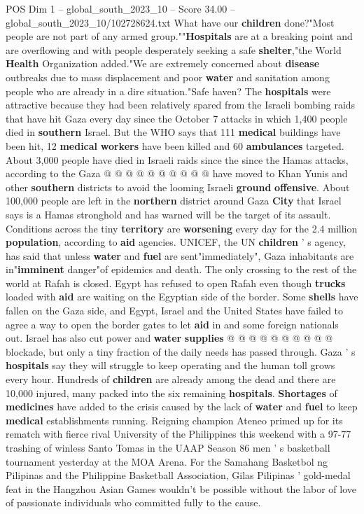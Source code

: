 \begin{textsample}{POS Dim 1 – global\_south\_2023\_10 – Score 34.00 – global\_south\_2023\_10/102728624.txt}
What have our \textbf{children} done?"Most people are not part of any armed group.""\textbf{Hospitals} are at a breaking point and are overflowing and with people desperately seeking a safe \textbf{shelter},"the World \textbf{Health} Organization added."We are extremely concerned about \textbf{disease} outbreaks due to mass displacement and poor \textbf{water} and sanitation among people who are already in a dire situation."Safe haven?
The \textbf{hospitals} were attractive because they had been relatively spared from the Israeli bombing raids that have hit Gaza every day since the October 7 attacks in which 1,400 people died in \textbf{southern} Israel.
But the WHO says that 111 \textbf{medical} buildings have been hit, 12 \textbf{medical} \textbf{workers} have been killed and 60 \textbf{ambulances} targeted.
About 3,000 people have died in Israeli raids since the since the Hamas attacks, according to the Gaza @ @ @ @ @ @ @ @ @ @ have moved to Khan Yunis and other \textbf{southern} districts to avoid the looming Israeli \textbf{ground} \textbf{offensive}.
About 100,000 people are left in the \textbf{northern} district around Gaza \textbf{City} that Israel says is a Hamas stronghold and has warned will be the target of its assault.
Conditions across the tiny \textbf{territory} are \textbf{worsening} every day for the 2.4 million \textbf{population}, according to \textbf{aid} agencies.
UNICEF, the UN \textbf{children} ' s agency, has said that unless \textbf{water} and \textbf{fuel} are sent"immediately", Gaza inhabitants are in"\textbf{imminent} danger"of epidemics and death.
The only crossing to the rest of the world at Rafah is closed.
Egypt has refused to open Rafah even though \textbf{trucks} loaded with \textbf{aid} are waiting on the Egyptian side of the border.
Some \textbf{shells} have fallen on the Gaza side, and Egypt, Israel and the United States have failed to agree a way to open the border gates to let \textbf{aid} in and some foreign nationals out.
Israel has also cut power and \textbf{water} \textbf{supplies} @ @ @ @ @ @ @ @ @ @ blockade, but only a tiny fraction of the daily needs has passed through.
Gaza ' s \textbf{hospitals} say they will struggle to keep operating and the human toll grows every hour.
Hundreds of \textbf{children} are already among the dead and there are 10,000 injured, many packed into the six remaining \textbf{hospitals}. \textbf{Shortages} of \textbf{medicines} have added to the crisis caused by the lack of \textbf{water} and \textbf{fuel} to keep \textbf{medical} establishments running.
Reigning champion Ateneo primed up for its rematch with fierce rival University of the Philippines this weekend with a 97-77 trashing of winless Santo Tomas in the UAAP Season 86 men ' s basketball tournament yesterday at the MOA Arena.
For the Samahang Basketbol ng Pilipinas and the Philippine Basketball Association, Gilas Pilipinas ' gold-medal feat in the Hangzhou Asian Games wouldn't be possible without the labor of love of passionate individuals who committed fully to the cause.


\end{textsample}
